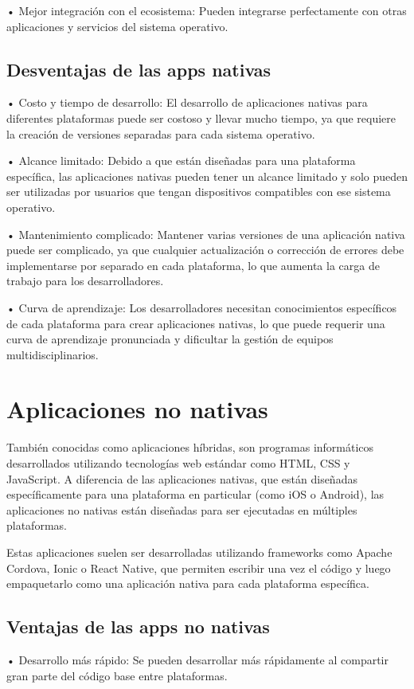 \documentclass{article}
\begin{document}
\begin{multicols}{2}
		• Mejor integración con el ecosistema: Pueden integrarse perfectamente con otras aplicaciones y servicios del sistema operativo.
		
		
		\subsection{Desventajas de las apps nativas }
		
		• Costo y tiempo de desarrollo: El desarrollo de aplicaciones nativas para diferentes plataformas puede ser costoso y llevar mucho tiempo, ya que requiere la creación de versiones separadas para cada sistema operativo.
		
		• Alcance limitado: Debido a que están diseñadas para una plataforma específica, las aplicaciones nativas pueden tener un alcance limitado y solo pueden ser utilizadas por usuarios que tengan dispositivos compatibles con ese sistema operativo.
	
		• Mantenimiento complicado: Mantener varias versiones de una aplicación nativa puede ser complicado, ya que cualquier actualización o corrección de errores debe implementarse por separado en cada plataforma, lo que aumenta la carga de trabajo para los desarrolladores.
		
		• Curva de aprendizaje: Los desarrolladores necesitan conocimientos específicos de cada plataforma para crear aplicaciones nativas, lo que puede requerir una curva de aprendizaje pronunciada y dificultar la gestión de equipos multidisciplinarios.
		
	
		\section{Aplicaciones no nativas}
		También conocidas como aplicaciones híbridas, son programas informáticos desarrollados utilizando tecnologías web estándar como HTML, CSS y JavaScript. A diferencia de las aplicaciones nativas, que están diseñadas específicamente para una plataforma en particular (como iOS o Android), las aplicaciones no nativas están diseñadas para ser ejecutadas en múltiples plataformas.
		
		Estas aplicaciones suelen ser desarrolladas utilizando frameworks como Apache Cordova, Ionic o React Native, que permiten escribir una vez el código y luego empaquetarlo como una aplicación nativa para cada plataforma específica.
		
		
		\subsection{Ventajas de las apps no nativas}
		• Desarrollo más rápido: Se pueden desarrollar más rápidamente al compartir gran parte del código base entre plataformas.
		

\end{multicols}
\end{document}

